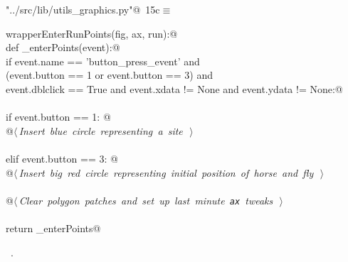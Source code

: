 \documentclass[11.5pt]{report}
\begin{document}
\begin{flushleft} \small\label{scrap7}\raggedright\small
{} \verb@"../src/lib/utils_graphics.py"@\nobreak\ {\footnotesize {15c}}$\equiv$
\vspace{-1ex}
\begin{list}{}{} \item
\mbox{}\verb@def wrapperEnterRunPoints(fig, ax, run):@\\
\mbox{}\verb@    def _enterPoints(event):@\\
\mbox{}\verb@        if event.name      == 'button_press_event'          and \@\\
\mbox{}\verb@           (event.button   == 1 or event.button == 3)       and \@\\
\mbox{}\verb@            event.dblclick == True and event.xdata  != None and event.ydata  != None:@\\
\mbox{}\verb@@\\
\mbox{}\verb@             if event.button == 1:  @\\
\mbox{}\verb@                 @\hbox{$\langle\,${\itshape Insert blue circle representing a site}\nobreak\ {\footnotesize {}}$\,\rangle$}\verb@@\\
\mbox{}\verb@@\\
\mbox{}\verb@             elif event.button == 3:  @\\
\mbox{}\verb@                 @\hbox{$\langle\,${\itshape Insert big red circle representing initial position of horse and fly}\nobreak\ {\footnotesize {}}$\,\rangle$}\verb@@\\
\mbox{}\verb@@\\
\mbox{}\verb@             @\hbox{$\langle\,${\itshape Clear polygon patches and set up last minute \verb|ax| tweaks}\nobreak\ {\footnotesize {}}$\,\rangle$}\verb@@\\
\mbox{}\verb@@\\
\mbox{}\verb@    return _enterPoints@\\
\mbox{}\verb@@{\NWsep}
\end{list}
\vspace{-1.5ex}
\footnotesize
\begin{list}{}{\setlength{\itemsep}{-\parsep}\setlength{\itemindent}{-\leftmargin}}
\item \NWtxtFileDefBy\ .

\item{}
\end{list}
\vspace{4ex}
\end{flushleft}
\end{document}
